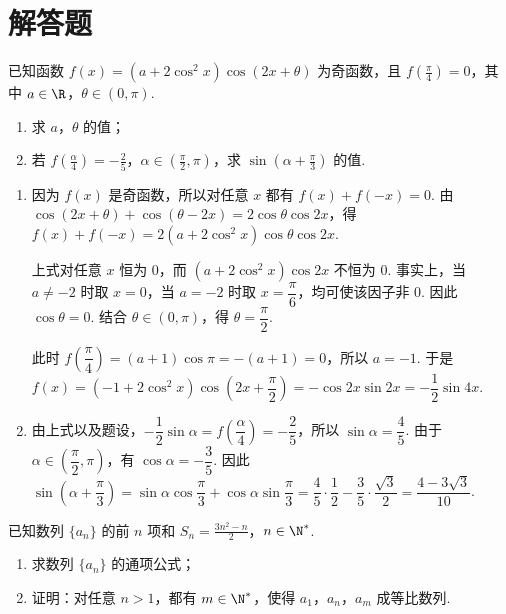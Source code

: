 \section{解答题}

\begin{problem}
已知函数 \( f(x) = (a + 2\cos^2 x)\cos (2x + \theta) \) 为奇函数，且 \( f\left(\frac{\pi}{4}\right) = 0 \)，其中 \(a \in \R\)，\(\theta \in (0, \pi)\).
\begin{enumerate}
\item 求 \(a\)，\(\theta\) 的值；
\item 若 \(f\left(\frac{\alpha}{4}\right) = -\frac{2}{5}\)，\(\alpha \in \left(\frac{\pi}{2}, \pi\right)\)，求 \( \sin \left(\alpha + \frac{\pi}{3}\right) \) 的值.
\end{enumerate}
\end{problem}

\begin{solution}
\begin{enumerate}
\item 因为 \(f(x)\) 是奇函数，所以对任意 \(x\) 都有 \(f(x)+f(-x)=0\). 由 \(\cos(2x+\theta)+\cos(\theta-2x)=2\cos\theta\cos2x\)，得
\(f(x)+f(-x)=2(a+2\cos^2x)\cos\theta\cos2x\).

上式对任意 \(x\) 恒为 0，而 \((a+2\cos^2x)\cos2x\) 不恒为 0. 事实上，当 \(a\ne-2\) 时取 \(x=0\)，当 \(a=-2\) 时取 \(x=\dfrac{\pi}{6}\)，均可使该因子非 0. 因此 \(\cos\theta=0\). 结合 \(\theta\in(0,\pi)\)，得 \(\theta=\dfrac{\pi}{2}\).

此时 \(f\left(\dfrac{\pi}{4}\right)=(a+1)\cos\pi=-(a+1)=0\)，所以 \(a=-1\). 于是
\(f(x)=(-1+2\cos^2x)\cos\left(2x+\dfrac{\pi}{2}\right)=-\cos2x\sin2x=-\dfrac12\sin4x\).
\item 由上式以及题设，\(-\dfrac12\sin\alpha=f\left(\dfrac{\alpha}{4}\right)=-\dfrac25\)，所以 \(\sin\alpha=\dfrac45\). 由于 \(\alpha\in\left(\dfrac{\pi}{2},\pi\right)\)，有 \(\cos\alpha=-\dfrac35\). 因此
\(\sin\left(\alpha+\dfrac{\pi}{3}\right)=\sin\alpha\cos\dfrac{\pi}{3}+\cos\alpha\sin\dfrac{\pi}{3}=\dfrac45\cdot\dfrac12-\dfrac35\cdot\dfrac{\sqrt3}{2}=\dfrac{4-3\sqrt3}{10}\).
\end{enumerate}
\end{solution}

\begin{problem}
已知数列 \(\{a_{n}\}\) 的前 \(n\) 项和 \(S_{n} = \frac{3n^{2} - n}{2}\)，\(n \in \N^*\).
\begin{enumerate}
\item 求数列 \( \{a_{n}\} \) 的通项公式；
\item 证明：对任意 \(n > 1\)，都有 \(m \in \N^*\)，使得 \(a_1\)，\(a_n\)，\(a_m\) 成等比数列.
\end{enumerate}
\end{problem}

